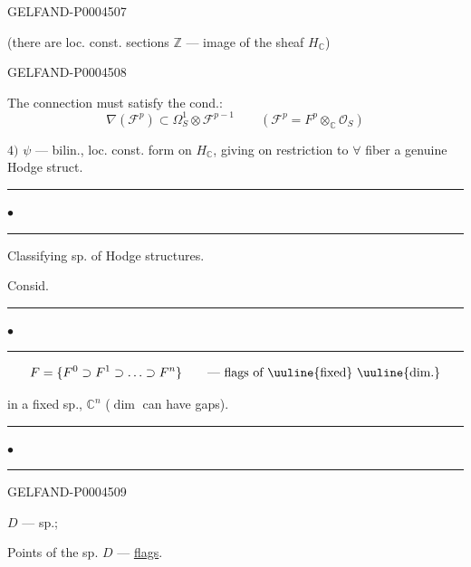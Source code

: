 \begin{GelfandAdjacentEvidence}{GELFAND-P000450}{7}


(there are loc. const. sections $\mathbb Z$ — image of the sheaf $H_{\mathbb C}$)
\end{GelfandAdjacentEvidence}
\begin{GelfandAdjacentEvidence}{GELFAND-P000450}{8}


The connection must satisfy the cond.:
\[
\nabla(\mathcal F^p)\subset\Omega_S^1\otimes\mathcal F^{p-1}
\qquad(\mathcal F^p=F^p\otimes_{\mathbb C}\mathcal O_S)
\]

$4)$ $\psi$ — bilin., loc. const. form on $H_{\mathbb C}$, giving on restriction to $\forall$ fiber a genuine Hodge struct.

\begin{center}
\rule[.5ex]{16mm}{.35pt}\enspace$\bullet$\enspace\rule[.5ex]{19mm}{.35pt}
\end{center}
Classifying sp. of Hodge structures.

Consid.\par
\hfill\rule[.5ex]{15mm}{.35pt}\enspace$\bullet$\enspace\rule[.5ex]{15mm}{.35pt}\hspace{20mm}
\[
F=\{F^0\supset F^1\supset\ldots\supset F^n\}
\qquad\text{— flags of }\mbox{\uuline{fixed}\ \uuline{dim.}}
\]

in a fixed sp., $\mathbb C^n$ ($\dim$ can have gaps).
\begin{center}
\rule[.5ex]{16mm}{.35pt}\enspace$\bullet$\enspace\rule[.5ex]{16mm}{.35pt}
\end{center}
\end{GelfandAdjacentEvidence}
\begin{GelfandAdjacentEvidence}{GELFAND-P000450}{9}


\underline{$D$} — sp.;

Points of the sp. \sout{\mbox{$D$}} — \underline{flags}.
\end{GelfandAdjacentEvidence}
